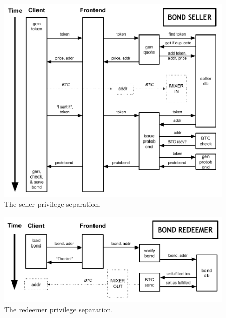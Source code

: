 \documentclass[12pt]{article}
\begin{document}
\begin{figure}[ht]
\begin{center}
\includegraphics[width=14cm]{dryer21-bond-seller-diagram.pdf}
\end{center}
\caption{The seller privilege separation.\label{seller}}
\end{figure}
\begin{figure}[ht]
\begin{center}
\includegraphics[width=14cm]{dryer21-bond-redeemer-diagram.pdf}
\end{center}
\caption{The redeemer privilege separation.\label{seller}}
\end{figure}
\end{document}
